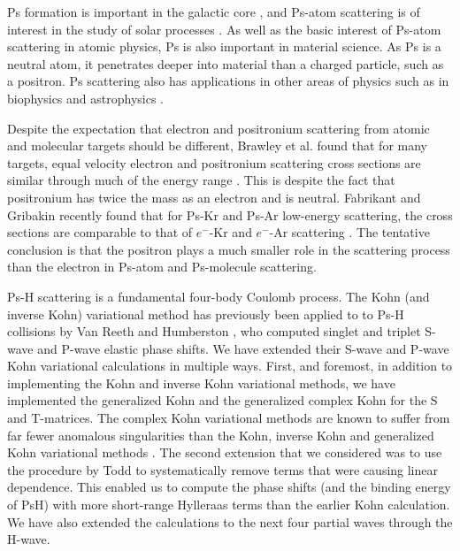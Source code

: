 \documentclass[preprint,showpacs,preprintnumbers,amsmath,amssymb]{revtex4}
\newcommand{\todoi}{\todo[inline]}
\begin{document}
\todoi{H$_2$ and N$_2$ where?}

Ps formation is important in the galactic core \cite{Kinzer1996}, and Ps-atom scattering is of interest in the study of solar processes \cite{Crannell1976}.
As well as the basic interest of Ps-atom scattering in atomic physics,
Ps is also important in material science.
As Ps is a neutral atom, it penetrates deeper into material than a charged particle,
such as a positron.
Ps scattering also has applications
in other areas of physics such as in biophysics and astrophysics \cite{Laricchia2012}.

Despite the expectation that electron and positronium scattering from atomic and molecular targets should be different, Brawley et al. found that for many targets, equal velocity electron and positronium scattering cross sections are similar through much of the energy range \cite{Brawley2010a,Brawley2010}. This is despite the fact that positronium has twice the mass as an electron and is neutral. Fabrikant and Gribakin recently found that for Ps-Kr and Ps-Ar low-energy scattering, the cross sections are comparable to that of $e^-$-Kr and $e^-$-Ar scattering \cite{Fabrikant2014,Fabrikant2014a}. The tentative conclusion is that the positron plays a much smaller role in the scattering process than the electron in Ps-atom and Ps-molecule scattering.

Ps-H scattering is a fundamental four-body Coulomb process. The Kohn (and inverse Kohn) variational method has previously been applied to
to Ps-H collisions by Van Reeth and Humberston \cite{VanReeth2003,VanReeth2004}, who computed singlet and triplet
S-wave and P-wave elastic phase shifts. 
We have extended their S-wave and P-wave Kohn variational calculations in multiple ways.
First, and foremost, in addition to implementing
the Kohn and inverse Kohn variational methods, we have
implemented the generalized Kohn and the generalized complex Kohn
for the S and T-matrices. 
The complex Kohn variational methods are known to suffer
from far fewer anomalous singularities than the
Kohn, inverse Kohn and generalized Kohn variational methods \cite{Lucchese1989, Cooper2009, Cooper2010}. 
The second extension that we considered was to use
the procedure by Todd to systematically remove terms that
were causing linear dependence.
This enabled us to compute the phase shifts (and the binding
energy of PsH) with more short-range Hylleraas terms than the earlier 
Kohn calculation. 
We have also extended the calculations to the next four partial waves through the H-wave.
\end{document}
